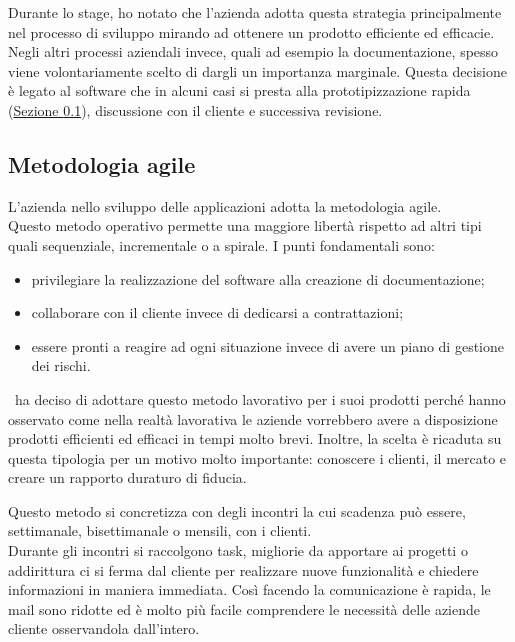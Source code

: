 Durante lo stage, ho notato che l'azienda adotta questa strategia principalmente nel processo di sviluppo mirando ad ottenere un prodotto efficiente ed efficacie. Negli altri processi aziendali invece, quali ad esempio la documentazione, spesso viene volontariamente scelto di dargli un importanza marginale. Questa decisione è legato al software che in alcuni casi si presta alla prototipizzazione rapida (\hyperref[cap1:Metodologia agile]{Sezione \ref{cap1:Metodologia agile}}), discussione con il cliente e successiva revisione. 
 

\subsection{Metodologia agile}
\label{cap1:Metodologia agile}

L'azienda nello sviluppo delle applicazioni adotta la metodologia agile. \\
Questo metodo operativo permette una maggiore libertà rispetto ad altri tipi quali sequenziale, incrementale o a spirale. I punti fondamentali sono:
\begin{itemize}
	\item privilegiare la realizzazione del software alla creazione di documentazione;
	\item collaborare con il cliente invece di dedicarsi a contrattazioni;
	\item essere pronti a reagire ad ogni situazione invece di avere un piano di gestione dei rischi.
\end{itemize}
\azienda\ ha deciso di adottare questo metodo lavorativo per i suoi prodotti perché hanno osservato come nella realtà lavorativa le aziende vorrebbero avere a disposizione prodotti efficienti ed efficaci in tempi molto brevi. 
Inoltre, la scelta è ricaduta su questa tipologia per un motivo molto importante: conoscere i clienti, il mercato e creare un rapporto duraturo di fiducia. 

Questo metodo si concretizza con degli incontri la cui scadenza può essere, settimanale, bisettimanale o mensili, con i clienti.\\
Durante gli incontri si raccolgono task, migliorie da apportare ai progetti o addirittura ci si ferma dal cliente per realizzare nuove funzionalità e chiedere informazioni in maniera immediata. Così facendo la comunicazione è rapida, le mail sono ridotte ed è molto più facile comprendere le necessità delle aziende cliente osservandola dall'intero.


